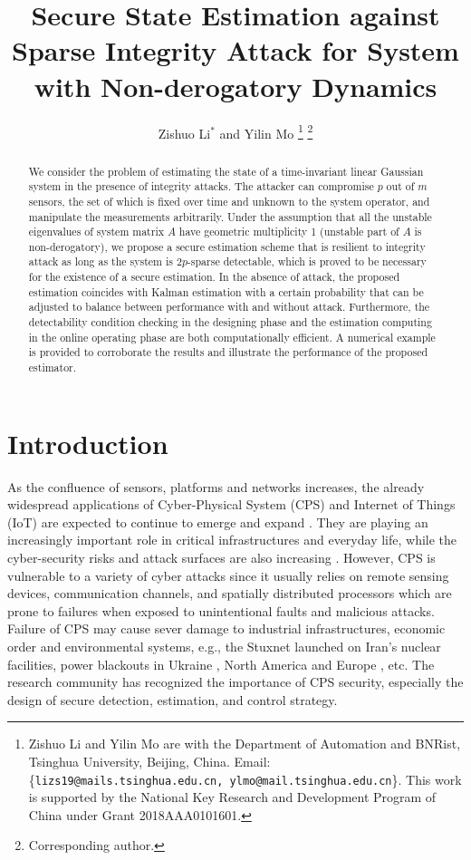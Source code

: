 \documentclass[12pt]{article}  %
\title{\LARGE \bf Secure State Estimation against Sparse Integrity Attack for System with Non-derogatory Dynamics}
\author{Zishuo Li$^*$ and Yilin Mo%
\thanks{Zishuo Li and Yilin Mo are with the Department of Automation and BNRist, Tsinghua University, Beijing, China. Email:\{\texttt{lizs19@mails.tsinghua.edu.cn, ylmo@mail.tsinghua.edu.cn}\}. This work is supported by the National Key Research and Development Program of China under Grant 2018AAA0101601.
}
\thanks{Corresponding author.}}
\date{}
\begin{document}
\maketitle


\begin{abstract}
We consider the problem of estimating the state of a time-invariant linear Gaussian system in the presence of integrity attacks. The attacker can compromise $p$ out of $m$ sensors, the set of which is fixed over time and unknown to the system operator, and manipulate the measurements arbitrarily. Under the assumption that all the unstable eigenvalues of system matrix $A$ have geometric multiplicity 1 (unstable part of $A$ is non-derogatory), we propose a secure estimation scheme that is resilient to integrity attack as long as the system is $2p$-sparse detectable, which is proved to be necessary for the existence of a secure estimation. In the absence of attack, the proposed estimation coincides with Kalman estimation with a certain probability that can be adjusted to balance between performance with and without attack. Furthermore, the detectability condition checking in the designing phase and the estimation computing in the online operating phase are both computationally efficient. A numerical example is provided to corroborate the results and illustrate the performance of the proposed estimator.


\end{abstract}
%
\section{Introduction}

As the confluence of sensors, platforms and networks increases, the already widespread applications of Cyber-Physical System (CPS) and Internet of Things (IoT) are expected to continue to emerge and expand \cite{2018DHS_report}.
They are playing an increasingly important role in critical infrastructures and everyday life, while the cyber-security risks and attack surfaces are also increasing \cite{cardenas2009challenges}.
However, CPS is vulnerable to a variety of cyber attacks since it usually relies on remote sensing devices, communication channels, and spatially distributed processors which are prone to failures when exposed to unintentional faults and malicious attacks.
Failure of CPS may cause sever damage to industrial infrastructures, economic order and environmental systems, e.g., the Stuxnet launched on Iran’s nuclear facilities\cite{STUXNET}, power blackouts in Ukraine \cite{Ukraine_Blackout}, North America and Europe \cite{2003_blackout}, etc. The research community has recognized the importance of CPS security, especially the design of secure detection, estimation, and control strategy\cite{cardenas2009challenges}. 
\end{document}
